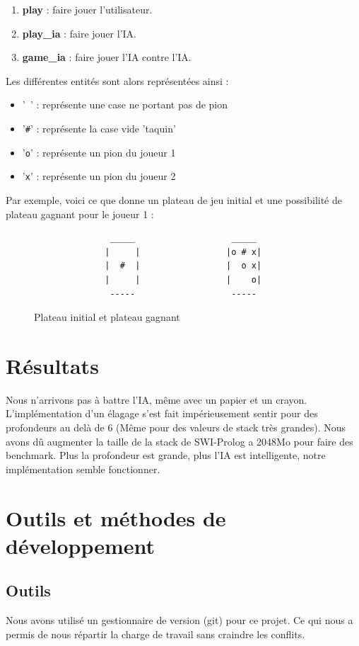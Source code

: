 \documentclass[a4paper,12pt]{article}
\begin{document}
  \begin{enumerate}
    \item \textbf{play} : faire jouer l'utilisateur.
    \item \textbf{play\_ia} : faire jouer l'IA.
    \item \textbf{game\_ia} : faire jouer l'IA contre l'IA.
  \end{enumerate}
  Les diff\'erentes entit\'es sont alors repr\'esent\'ees ainsi :

  \begin{itemize}
    \item{'\texttt{ }' : repr\'esente une case ne portant pas de pion}
    \item{'\texttt{\#}' : repr\'esente la case vide 'taquin'}
    \item{'\texttt{o}' : repr\'esente un pion du joueur 1}
    \item{'\texttt{x}' : repr\'esente un pion du joueur 2}
  \end{itemize}

  Par exemple, voici ce que donne un plateau de jeu initial et une possibilité de plateau gagnant pour le joueur 1 :
  \begin{figure}[H]
  \begin{verbatim}
               _____                   _____
              |     |                 |o # x|
              |  #  |                 |  o x|
              |     |                 |    o|
               -----                   -----
  \end{verbatim}
  \caption{Plateau initial et plateau gagnant}
  \end{figure}
  
\section{Résultats}
Nous n'arrivons pas à battre l'IA, même avec un papier et un crayon. L'implémentation d'un élagage s'est fait impérieusement sentir pour des profondeurs au delà de 6 (Même pour des valeurs de stack très grandes). Nous avons dû augmenter la taille de la stack de SWI-Prolog a 2048Mo pour faire des benchmark. Plus la profondeur est grande, plus l'IA est intelligente, notre implémentation semble fonctionner.

\section{Outils et méthodes de développement}
\subsection{Outils}
Nous avons utilisé un gestionnaire de version (git) pour ce projet. Ce qui nous a permis de nous répartir la charge de travail sans craindre les conflits. 
\end{document}
